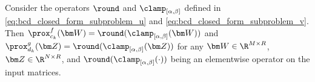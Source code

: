 \begin{lem}
    Consider the operators $\round$ and $\clamp_{[\alpha,\beta]}$ defined in \eqref{eq:bcd_closed_form_subproblem_u} and \eqref{eq:bcd_closed_form_subproblem_v}.
    Then $\prox^f_{c_k}(\bm W) = \round(\clamp_{[\alpha,\beta]}(\bm W))$ and $\prox^g_{d_k}(\bm Z) = \round(\clamp_{[\alpha,\beta]}(\bm Z))$ for any $\bm W\in \R^{M\times R}$, $\bm Z\in\R^{N\times R}$, and $\round(\clamp_{[\alpha,\beta]}(\cdot))$ being an elementwise operator on the input matrices.
\end{lem}
